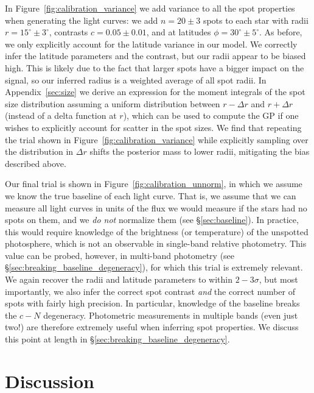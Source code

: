 \documentclass[modern]{aastex62}
\begin{document}
In Figure~\ref{fig:calibration_variance} we add variance to all the spot
properties when generating the light curves: we add $n = 20 \pm 3$ spots
to each star with radii $r = 15^\circ \pm 3^\circ$, contrasts
$c = 0.05 \pm 0.01$, and at latitudes $\phi = 30^\circ \pm 5^\circ$.
As before, we only explicitly account for the latitude variance in our
model. We correctly infer the latitude parameters and the contrast, but
our radii appear to be biased high. This is likely due to the fact that
larger spots have a bigger impact on the signal, so our inferred radius
is a weighted average of all spot radii. In Appendix~\ref{sec:size} we
derive an expression for the moment integrals of the spot size distribution
assuming a uniform distribution between $r - \Delta r$ and $r + \Delta r$
(instead of a delta function at $r$), which can be used to compute the
GP if one wishes to explicitly account for scatter in the spot sizes.
We find that repeating the trial shown in Figure~\ref{fig:calibration_variance}
while explicitly sampling over the distribution in $\Delta r$ shifts the
posterior mass to lower radii, mitigating the bias described above.

Our final trial is shown in Figure~\ref{fig:calibration_unnorm}, in which
we assume we know the true baseline of each light curve. That is, we
assume that we can measure all light curves in units of the flux we would
measure if the stars had no spots on them, and we \emph{do not}
normalize them (see \S\ref{sec:baseline}). In practice, this would require
knowledge of the brightness (or temperature) of the unspotted
photosphere, which is not an observable in single-band relative photometry.
This value can be probed, however, in multi-band photometry
(see \S\ref{sec:breaking_baseline_degeneracy}), for which this trial is
extremely relevant. We again recover the radii and latitude parameters
to within $2-3\sigma$, but most importantly, we also infer the correct
spot contrast \emph{and} the correct number of spots with fairly high
precision. In particular, knowledge of the baseline breaks the $c-N$ degeneracy.
Photometric measurements in multiple bands (even just two!)
are therefore extremely useful when inferring spot properties.
We discuss this point at length in \S\ref{sec:breaking_baseline_degeneracy}.

\section{Discussion}
\label{sec:discussion}
\end{document}
